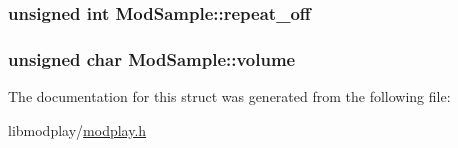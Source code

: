 \subsubsection[{repeat\+\_\+off}]{\setlength{\rightskip}{0pt plus 5cm}unsigned int Mod\+Sample\+::repeat\+\_\+off}\label{structModSample_aa2222ff52c86152fc631171db9113290}
\hypertarget{structModSample_a4162e3c9eb5e2a13fd90f871fc2d950e}{}
\subsubsection[{volume}]{\setlength{\rightskip}{0pt plus 5cm}unsigned char Mod\+Sample\+::volume}\label{structModSample_a4162e3c9eb5e2a13fd90f871fc2d950e}


The documentation for this struct was generated from the following file\+:\begin{DoxyCompactItemize}
\item 
libmodplay/\hyperlink{modplay_8h}{modplay.\+h}\end{DoxyCompactItemize}
